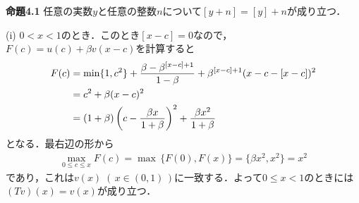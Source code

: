 \documentclass[a4paper,11pt]{jsarticle}
\DeclareRobustCommand{\lfrac}[2]{{\lower.4ex\hbox{\begingroup\ensuremath{#1}\endgroup}\over{\hspace{.2mm}#2\hspace{.2mm}}}}
\begin{document}
\vspace*{7mm}
\noindent \textbf{命題4.1}\hspace*{.7mm} 任意の実数$y$と任意の整数$n$について$[y+n]=[y]+n$が成り立つ．
\vspace*{7mm}

\noindent (i) $0< x <1$のとき．このとき$[x-c]=0$なので，$F(c)=u(c)+\beta v(x-c)$を計算すると
\begin{align*}
	F(c)&=\min\{1,c^2\}+\lfrac{\beta-\beta^{[x-c]+1}}{1-\beta}+\beta^{[x-c]+1}(x-c-[x-c])^2\\
				&=c^2+\beta (x-c)^2\\
				&=(1+\beta)\left(c-\lfrac{\beta x}{1+\beta}\right)^2+\lfrac{\beta x^2}{1+\beta}
\end{align*}
となる．最右辺の形から
\begin{align*}
	\max_{0\leq c \leq x} F(c)=\max \,\{F(0),F(x)\}=\{\beta x^2, x^2\}=x^2
\end{align*}
であり，これは$v(x)\;(\,x\in (0,1)\,)$に一致する．よって$0\leq x<1$のときには
$(Tv)(x)=v(x)$が成り立つ．

\bigskip
\end{document}
